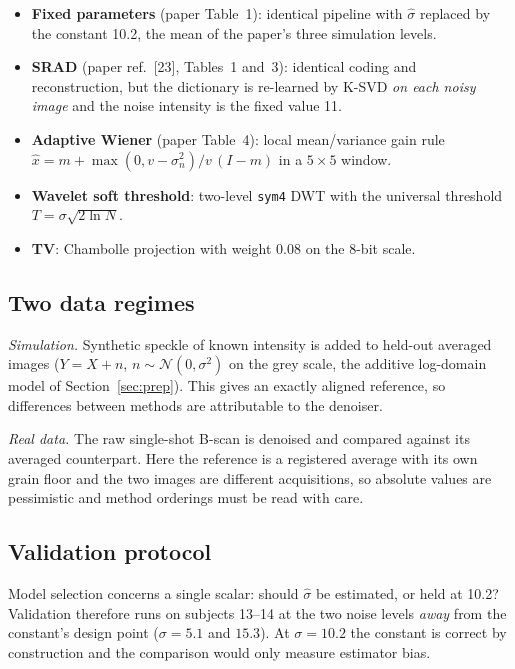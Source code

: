 \documentclass[11pt,a4paper]{article}
\newcommand{\sh}{\hat{\sigma}}
\begin{document}
\begin{itemize}
  \item \textbf{Fixed parameters} (paper Table~1): identical pipeline with $\sh$ replaced by the constant 10.2,
        the mean of the paper's three simulation levels.
  \item \textbf{SRAD} (paper ref.~[23], Tables~1 and~3): identical coding and reconstruction, but the dictionary is
        re-learned by K-SVD \emph{on each noisy image} and the noise intensity is the fixed value 11.
  \item \textbf{Adaptive Wiener} (paper Table~4): local mean/variance gain rule
        $\hat x=m+\max(0,v-\sigma_n^2)/v\,(I-m)$ in a $5\times5$ window.
  \item \textbf{Wavelet soft threshold}: two-level \texttt{sym4} DWT with the universal threshold
        $T=\sigma\sqrt{2\ln N}$.
  \item \textbf{TV}: Chambolle projection with weight 0.08 on the 8-bit scale.
\end{itemize}

\subsection{Two data regimes}

\emph{Simulation.} Synthetic speckle of known intensity is added to held-out averaged images
($Y=X+n$, $n\sim\mathcal N(0,\sigma^2)$ on the grey scale, the additive log-domain model of Section~\ref{sec:prep}).
This gives an exactly aligned reference, so differences between methods are attributable to the denoiser.

\emph{Real data.} The raw single-shot B-scan is denoised and compared against its averaged counterpart. Here the
reference is a registered average with its own grain floor and the two images are different acquisitions, so
absolute values are pessimistic and method orderings must be read with care.

\subsection{Validation protocol}

Model selection concerns a single scalar: should $\sh$ be estimated, or held at 10.2? Validation therefore runs on
subjects 13--14 at the two noise levels \emph{away} from the constant's design point ($\sigma=5.1$ and $15.3$).
At $\sigma=10.2$ the constant is correct by construction and the comparison would only measure estimator bias.
\end{document}
